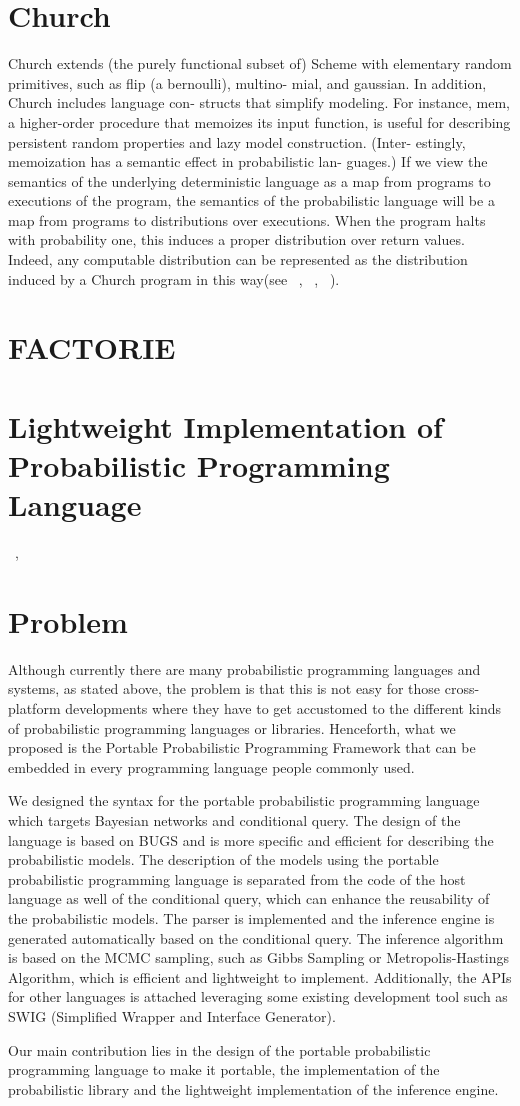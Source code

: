 \section{Church}
Church extends (the purely functional subset of) Scheme with elementary random primitives, such as flip (a bernoulli), multino- mial, and gaussian. In addition, Church includes language con- structs that simplify modeling. For instance, mem, a higher-order procedure that memoizes its input function, is useful for describing persistent random properties and lazy model construction. (Inter- estingly, memoization has a semantic effect in probabilistic lan- guages.) If we view the semantics of the underlying deterministic language as a map from programs to executions of the program, the semantics of the probabilistic language will be a map from programs to distributions over executions. When the program halts with probability one, this induces a proper distribution over return values. Indeed, any computable distribution can be represented as the distribution induced by a Church program in this way(see ~\cite{goodman}, ~\cite{church}, ~\cite{lightweight}).
\section{FACTORIE}

\section{Lightweight Implementation of Probabilistic Programming Language}
~\cite{lightweight}, ~\cite{nonstandard}

\section{Problem}
\label{sec:prob}

Although currently there are many probabilistic programming languages and systems, as stated above, the problem is that this is not easy for those cross-platform developments where they have to get accustomed to the different kinds of probabilistic programming languages or libraries. Henceforth, what we proposed is the Portable Probabilistic Programming Framework that can be embedded in every programming language people commonly used.

We designed the syntax for the portable probabilistic programming language which targets Bayesian networks and conditional query. The design of the language is based on BUGS and is more specific and efficient for describing the probabilistic models. The description of the models using the portable probabilistic programming language is separated from the code of the host language as well of the conditional query, which can enhance the reusability of the probabilistic models. The parser is implemented and the inference engine is generated automatically based on the conditional query. The inference algorithm is based on the MCMC sampling, such as Gibbs Sampling or Metropolis-Hastings Algorithm, which is efficient and lightweight to implement. Additionally, the APIs for other languages is attached leveraging some existing development tool such as SWIG (Simplified Wrapper and Interface Generator). 

Our main contribution lies in the design of the portable probabilistic programming language to make it portable, the implementation of the probabilistic library and the lightweight implementation of the inference engine. 
